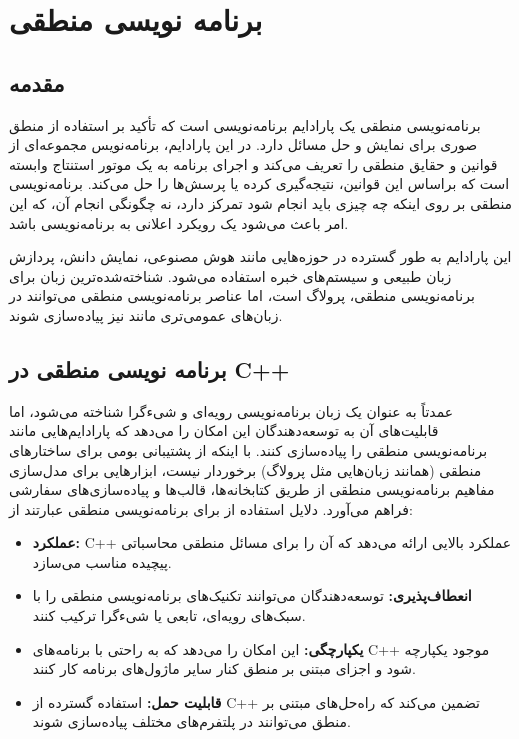 \documentclass[12pt, a4paper]{report}
\begin{document}
\chapter{برنامه نویسی منطقی}
\section{مقدمه}
برنامه‌نویسی منطقی یک پارادایم برنامه‌نویسی است که تأکید بر استفاده از منطق صوری برای نمایش و حل مسائل دارد. در این پارادایم، برنامه‌نویس مجموعه‌ای از قوانین و حقایق منطقی را تعریف می‌کند و اجرای برنامه به یک موتور استنتاج وابسته است که براساس این قوانین، نتیجه‌گیری کرده یا پرسش‌ها را حل می‌کند. برنامه‌نویسی منطقی بر روی اینکه چه چیزی باید انجام شود تمرکز دارد، نه چگونگی انجام آن، که این امر باعث می‌شود یک رویکرد اعلانی به برنامه‌نویسی باشد.

این پارادایم به طور گسترده در حوزه‌هایی مانند هوش مصنوعی، نمایش دانش، پردازش زبان طبیعی و سیستم‌های خبره استفاده می‌شود. شناخته‌شده‌ترین زبان برای برنامه‌نویسی منطقی، پرولاگ است، اما عناصر برنامه‌نویسی منطقی می‌توانند در زبان‌های عمومی‌تری مانند  نیز پیاده‌سازی شوند.

\section{برنامه نویسی منطقی در C++}
 عمدتاً به عنوان یک زبان برنامه‌نویسی رویه‌ای و شیءگرا شناخته می‌شود، اما قابلیت‌های آن به توسعه‌دهندگان این امکان را می‌دهد که پارادایم‌هایی مانند برنامه‌نویسی منطقی را پیاده‌سازی کنند. با اینکه از پشتیبانی بومی برای ساختارهای منطقی (همانند زبان‌هایی مثل پرولاگ) برخوردار نیست،  ابزارهایی برای مدل‌سازی مفاهیم برنامه‌نویسی منطقی از طریق کتابخانه‌ها، قالب‌ها و پیاده‌سازی‌های سفارشی فراهم می‌آورد. دلایل استفاده از  برای برنامه‌نویسی منطقی عبارتند از:

\begin{itemize}
	
\item \textbf{عملکرد:} C++ عملکرد بالایی ارائه می‌دهد که آن را برای مسائل منطقی محاسباتی پیچیده مناسب می‌سازد.

\item \textbf{انعطاف‌پذیری:} توسعه‌دهندگان می‌توانند تکنیک‌های برنامه‌نویسی منطقی را با سبک‌های رویه‌ای، تابعی یا شیءگرا ترکیب کنند.

\item \textbf{یکپارچگی:} این امکان را می‌دهد که به راحتی با برنامه‌های C++ موجود یکپارچه شود و اجزای مبتنی بر منطق کنار سایر ماژول‌های برنامه کار کنند.
\item \textbf{قابلیت حمل:} استفاده گسترده از C++ تضمین می‌کند که راه‌حل‌های مبتنی بر منطق می‌توانند در پلتفرم‌های مختلف پیاده‌سازی شوند.
\end{itemize}
\end{document}
